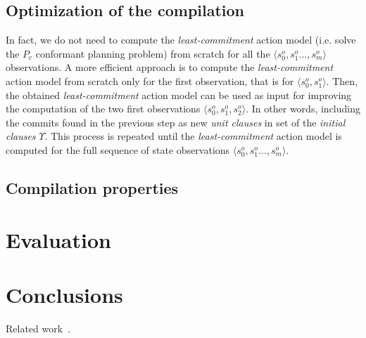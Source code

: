 \documentclass{article}
\newcommand{\tup}[1]{{\langle #1 \rangle}}
\begin{document}
\subsection{Optimization of the compilation}
In fact, we do not need to compute the {\em least-commitment} action model (i.e. solve the $P_c$ conformant planning problem) from scratch for all the $\tup{s_0^o,s_1^o \ldots , s_m^o}$ observations. A more efficient approach is to compute the {\em least-commitment} action model from scratch only for the first observation, that is for $\tup{s_0^o,s_1^o}$. Then, the obtained {\em least-commitment} action model can be used as input for improving the computation of the two first observations $\tup{s_0^o,s_1^o,s_2^o}$. In other words, including the commits found in the previous step as new {\em unit clauses} in set of the {\em initial clauses} $\Upsilon$. This process is repeated until the {\em least-commitment} action model is computed  for the full sequence of state observations $\tup{s_0^o,s_1^o \ldots , s_m^o}$.

\subsection{Compilation properties}



\section{Evaluation}



\section{Conclusions}
Related work~\cite{SternJ17}.




\end{document}
